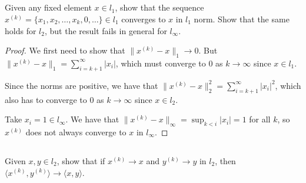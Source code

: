 

\subsection{} Given any fixed element $x\in l_1$, show that the sequence $x^{(k)} = \{x_1, x_2, \dots, x_k, 0, \dots\} \in l_1$ converges to $x$ in $l_1$ norm. Show that the same holds for $l_2$, but the result fails in general for $l_\infty$.

\begin{proof}
We first need to show that $\|x^{(k)} - x\|_1 \rightarrow 0$. But $\|x^{(k)} - x\|_1 = \sum_{i=k+1}^\infty |x_i|$, which must converge to 0 as $k \rightarrow \infty$ since $x \in l_1$.

Since the norms are positive, we have that $\|x^{(k)} - x\|_2^2 =  \sum_{i=k+1}^\infty |x_i|^2$, which also has to converge to 0 as $k \rightarrow \infty$ since $x \in l_2$.

Take $x_i = 1 \in l_\infty$. We have that $\|x^{(k)} - x\|_\infty = \sup_{k < i} |x_i| = 1$ for all $k$, so $x^{(k)}$ does not always converge to $x$ in $l_\infty$.

\end{proof}

\subsection{} Given $x, y \in l_2$, show that if $x^{(k)} \rightarrow x$ and $y^{(k)} \rightarrow y$ in $l_2$, then $\langle x^{(k)}, y^{(k)} \rangle \rightarrow \langle x, y \rangle$.

